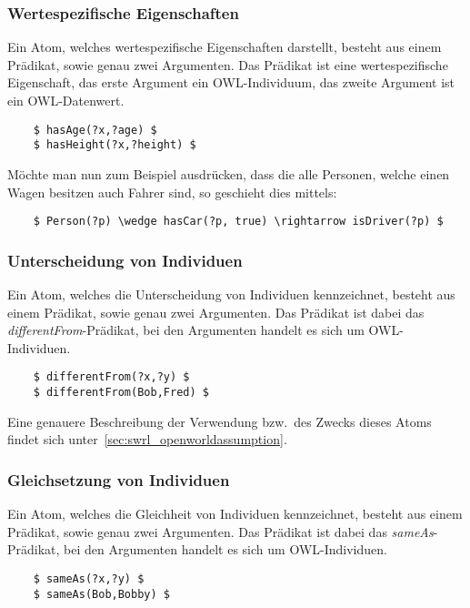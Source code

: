 \subsubsection{Wertespezifische Eigenschaften}
\label{ssubsec:swrl_aufbau_atomaretypen_wertespezifischeeigenschaften}
Ein Atom, welches wertespezifische Eigenschaften darstellt, besteht aus einem Prädikat, sowie genau zwei Argumenten. Das Prädikat ist eine wertespezifische Eigenschaft, das erste Argument ein OWL-Individuum, das zweite Argument ist ein OWL-Datenwert.
\lstset{language=XML}
\begin{lstlisting}
    $ hasAge(?x,?age) $
    $ hasHeight(?x,?height) $
\end{lstlisting}

Möchte man nun zum Beispiel ausdrücken, dass die alle Personen, welche einen Wagen besitzen auch Fahrer sind, so geschieht dies mittels:
\lstset{language=XML}
\begin{lstlisting}
    $ Person(?p) \wedge hasCar(?p, true) \rightarrow isDriver(?p) $
\end{lstlisting}

\subsubsection{Unterscheidung von Individuen}
\label{ssubsec:swrl_aufbau_atomaretypen_unterscheidungvonindividuen}
Ein Atom, welches die Unterscheidung von Individuen kennzeichnet, besteht aus einem Prädikat, sowie genau zwei Argumenten. Das Prädikat ist dabei das \textit{differentFrom}-Prädikat, bei den Argumenten handelt es sich um OWL-Individuen.
\lstset{language=XML}
\begin{lstlisting}
    $ differentFrom(?x,?y) $
    $ differentFrom(Bob,Fred) $
\end{lstlisting}
Eine genauere Beschreibung der Verwendung bzw.\ des Zwecks dieses Atoms findet sich unter~\ref{sec:swrl_openworldassumption}.

\subsubsection{Gleichsetzung von Individuen}
\label{ssubsec:swrl_aufbau_atomaretypen_gleichsetzungvonindividuen}
Ein Atom, welches die Gleichheit von Individuen kennzeichnet, besteht aus einem Prädikat, sowie genau zwei Argumenten. Das Prädikat ist dabei das \textit{sameAs}-Prädikat, bei den Argumenten handelt es sich um OWL-Individuen.
\lstset{language=XML}
\begin{lstlisting}
    $ sameAs(?x,?y) $
    $ sameAs(Bob,Bobby) $
\end{lstlisting}

